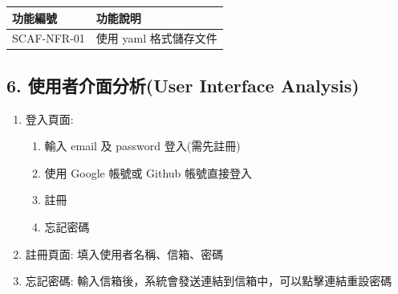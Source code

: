 \documentclass{report}
\begin{document}
\begin{tabularx}{\textwidth}{
  |p{}%
  |p{}|%
}
  \hline
  功能編號 &  功能說明 \\ \hline
  SCAF-NFR-01 & 使用 yaml 格式儲存文件 \\ \hline
\end{tabularx}

\subsection*{6. 使用者介面分析(User Interface Analysis)}
\begin{enumerate}
  \item 登入頁面:
    \begin{enumerate}
      \item 輸入 email 及 password 登入(需先註冊)
      \item 使用 Google 帳號或 Github 帳號直接登入
      \item 註冊
      \item 忘記密碼
    \end{enumerate}
  \item 註冊頁面: 填入使用者名稱、信箱、密碼
  \item 忘記密碼: 輸入信箱後，系統會發送連結到信箱中，可以點擊連結重設密碼
\end{enumerate}
\end{document}
